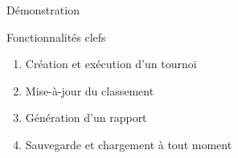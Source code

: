 \begin{frame}{Démonstration}
  \begin{block}{Fonctionnalités clefs}
    \begin{enumerate}
    \item Création et exécution d'un tournoi
    \item Mise-à-jour du classement
    \item Génération d'un rapport
    \item Sauvegarde et chargement à tout moment
    \end{enumerate}
  \end{block}
\end{frame}
